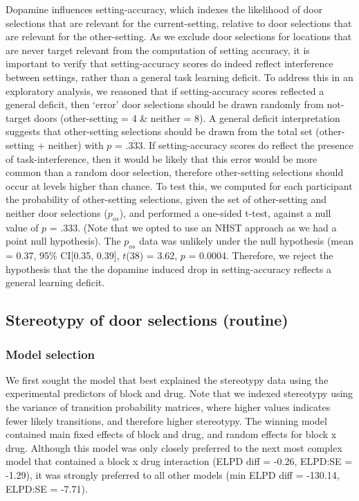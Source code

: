 \documentclass[
  man]{apa6}
\begin{document}
Dopamine influences setting-accuracy, which indexes the likelihood of door selections that are relevant for the current-setting, relative to door selections that are relevant for the other-setting. As we exclude door selections for locations that are never target relevant from the computation of setting accuracy, it is important to verify that setting-accuracy scores do indeed reflect interference between settings, rather than a general task learning deficit. To address this in an exploratory analysis, we reasoned that if setting-accuracy scores reflected a general deficit, then `error' door selections should be drawn randomly from not-target doors (other-setting = 4 \& neither = 8). A general deficit interpretation suggests that other-setting selections should be drawn from the total set (other-setting + neither) with \(p\) = \(\overline{.333}\). If setting-accuracy scores do reflect the presence of task-interference, then it would be likely that this error would be more common than a random door selection, therefore other-setting selections should occur at levels higher than chance. To test this, we computed for each participant the probability of other-setting selections, given the set of other-setting and neither door selections (\(p_{os}\)), and performed a one-sided t-test, against a null value of \(p\) = .333. (Note that we opted to use an NHST approach as we had a point null hypothesis). The \(p_{os}\) data was unlikely under the null hypothesis (mean = 0.37, 95\% CI{[}0.35, 0.39{]}, \(t\)(38) = 3.62, \(p\) = 0.0004. Therefore, we reject the hypothesis that the the dopamine induced drop in setting-accuracy reflects a general learning deficit.

\hypertarget{stereotypy-of-door-selections-routine}{%
\subsection{Stereotypy of door selections (routine)}\label{stereotypy-of-door-selections-routine}}

\label{sec:Stereotypy Results}

\hypertarget{model-selection-2}{%
\subsubsection{Model selection}\label{model-selection-2}}

We first sought the model that best explained the stereotypy data using the experimental predictors of block and drug. Note that we indexed stereotypy using the variance of transition probability matrices, where higher values indicates fewer likely transitions, and therefore higher stereotypy. The winning model contained main fixed effects of block and drug, and random effects for block x drug. Although this model was only closely preferred to the next most complex model that contained a block x drug interaction (ELPD diff = -0.26, ELPD:SE = -1.29), it was strongly preferred to all other models (min ELPD diff = -130.14, ELPD:SE = -7.71).
\end{document}

